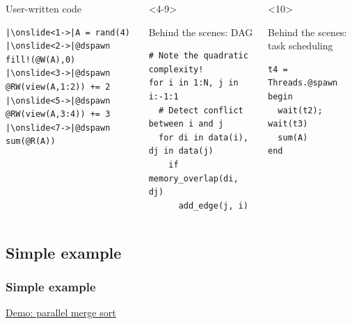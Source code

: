 \documentclass{beamer}
\begin{document}
\begin{frame}[fragile]

\begin{columns}[T]
\begin{exampleblock}{User-written code}
\begin{verbatim}
|\onslide<1->|A = rand(4)
|\onslide<2->|@dspawn fill!(@W(A),0)
|\onslide<3->|@dspawn @RW(view(A,1:2)) += 2
|\onslide<5->|@dspawn @RW(view(A,3:4)) += 3
|\onslide<7->|@dspawn sum(@R(A))
\end{verbatim}    
\end{exampleblock}
  
\begin{onlyenv}<4-9>
  \begin{exampleblock}{Behind the scenes: DAG}
\begin{verbatim}
# Note the quadratic complexity!
for i in 1:N, j in i:-1:1
  # Detect conflict between i and j
  for di in data(i), dj in data(j)
    if memory_overlap(di, dj)
      add_edge(j, i)
\end{verbatim}
\end{exampleblock}
\end{onlyenv}
\begin{onlyenv}<10>
\begin{exampleblock}{Behind the scenes: task scheduling}
\begin{verbatim}
t4 = Threads.@spawn begin
  wait(t2); wait(t3)
  sum(A)
end
\end{verbatim}
\end{exampleblock}
\end{onlyenv}
\end{columns}


\end{frame}

\subsection{Simple example}

\begin{frame}
\frametitle{Simple example}
\center \href{run:./sort.slides.html}{\LARGE{Demo: parallel merge sort}}

\end{frame}
\end{document}
